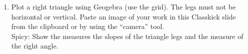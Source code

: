 \documentclass[12pt, twoside]{article}
\begin{document}
\begin{enumerate}
\newpage
\item Plot a right triangle using Geogebra (use the grid). The legs must not be horizontal or vertical. Paste an image of your work in this Classkick slide from the clipboard or by using the ``camera'' tool.\\[0.25cm]
Spicy: Show the measures the slopes of the triangle legs and the measure of the right angle.

    
\end{enumerate}
\end{document}
